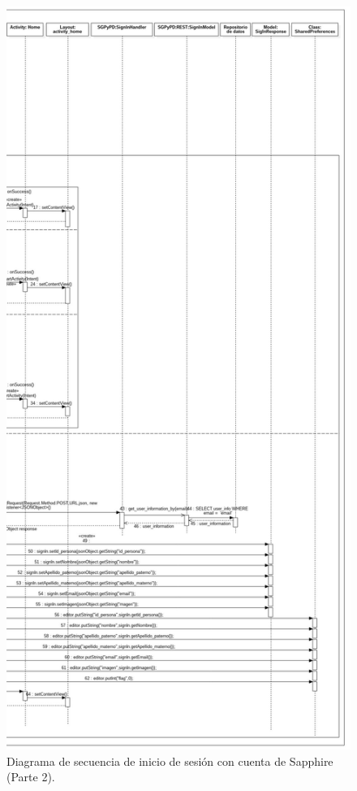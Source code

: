 \FloatBarrier
\begin{figure}[htbp!]
		\centering
			\includegraphics[width=.6 \textwidth]{imagenes/Diagramas_UserApp/Nuevos_diagramas/inicioSap2}
		\caption{Diagrama de secuencia de inicio de sesión con cuenta de Sapphire (Parte 2).}
		\label{image:inicioSap2}
\end{figure}
\FloatBarrier





